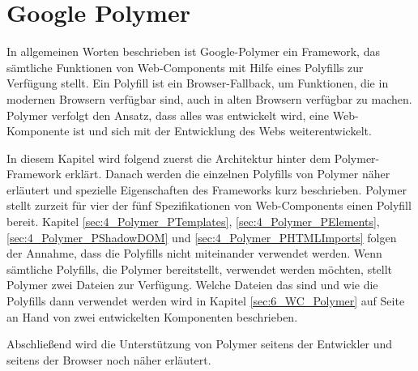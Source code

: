 \section{Google Polymer}
\label{sec:4_Polymer}

In allgemeinen Worten beschrieben ist Google-Polymer ein Framework, das sämtliche Funktionen von Web-Components mit Hilfe eines Polyfills zur Verfügung stellt. Ein Polyfill ist ein Browser-Fallback, um Funktionen, die in modernen Browsern verfügbar sind, auch in alten Browsern verfügbar zu machen. Polymer verfolgt den Ansatz, dass alles was entwickelt wird, eine Web-Komponente ist und sich mit der Entwicklung des Webs weiterentwickelt.

In diesem Kapitel wird folgend zuerst die Architektur hinter dem Polymer-Framework erklärt. Danach werden die einzelnen Polyfills von Polymer näher erläutert und spezielle Eigenschaften des Frameworks kurz beschrieben. Polymer stellt zurzeit für vier der fünf Spezifikationen von Web-Components einen Polyfill bereit. Kapitel \ref{sec:4_Polymer_PTemplates}, \ref{sec:4_Polymer_PElements}, \ref{sec:4_Polymer_PShadowDOM} und \ref{sec:4_Polymer_PHTMLImports} folgen der Annahme, dass die Polyfills nicht miteinander verwendet werden. Wenn sämtliche Polyfills, die Polymer bereitstellt, verwendet werden möchten, stellt Polymer zwei Dateien zur Verfügung. Welche Dateien das sind und wie die Polyfills dann verwendet werden wird in Kapitel \ref{sec:6_WC_Polymer} auf Seite \pageref{sec:6_WC_Polymer} an Hand von zwei entwickelten Komponenten beschrieben.

Abschließend wird die Unterstützung von Polymer seitens der Entwickler und seitens der Browser noch näher erläutert.








